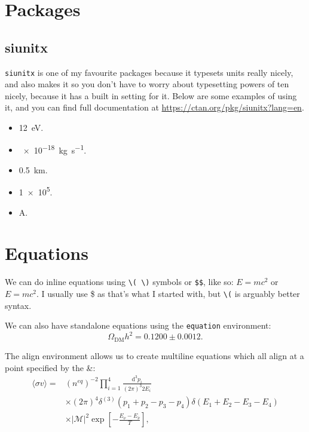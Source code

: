 \documentclass[12pt]{article}
\begin{document}
\section{Packages}
\label{sec:packages}
\subsection{siunitx}

\verb|siunitx| is one of my favourite packages because it typesets units really nicely, and also makes it so you don't have to worry about typesetting powers of ten nicely, because it has a built in setting for it. Below are some examples of using it, and you can find full documentation at \url{https://ctan.org/pkg/siunitx?lang=en}. 
\begin{itemize}
	\item \qty{12}{\electronvolt}.
	\item \qty{e-18}{\kilogram\per\second}.
	\item \qty{0.5}{\kilo\meter}.
	\item \num{1e5}.
        \item \unit{\ampere}.
\end{itemize}

\section{Equations}
\label{sec:eq}
We can do inline equations using \verb|\( \)| symbols or \verb|$$|, like so: \(E=mc^2\) or $E=mc^2$. I usually use \$ as that's what I started with, but \verb|\(| is arguably better syntax.

We can also have standalone equations using the \verb|equation| environment:
\begin{equation}
	\Omega_{\text{DM}} h^2 = 0.1200 \pm 0.0012.
	\label{eq:relic_density}
\end{equation}

The align environment allows us to create multiline equations which all align at a point specified by the \&:
\begin{align}
	\langle\sigma v \rangle =& (n^{eq})^{-2} \prod_{i=1}^{4} \frac{\mathrm{d}^3 p_i}{(2\pi)^3 2E_i} \\
	& \times (2\pi)^4 \delta^{(3)}(p_1 +p_2-p_3-p_4)\delta(E_1+E_2-E_3-E_4) \\
	& \times |\mathcal{M}|^2 \exp\left[-\frac{E_\nu-E_{\bar{\nu}}}{T}\right],
	\label{eq:crosssec}
\end{align}
\end{document}
